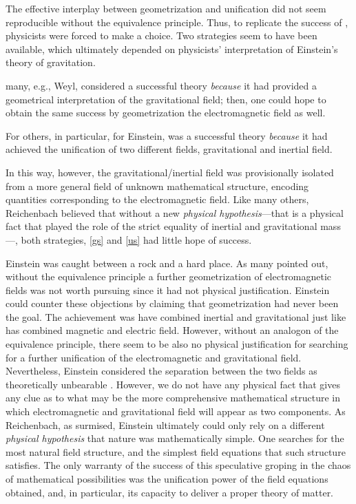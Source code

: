 \documentclass[draft]{article}
\begin{document}
The effective interplay between geometrization and unification did not seem reproducible without the equivalence principle. Thus, to replicate the success of \gr, physicists were forced to make a choice. Two strategies seem to have been available, which ultimately depended on physicists' interpretation of Einstein's theory of gravitation. \begin{inparaenum}[(a)] \item \label{gs} many, e.g., Weyl, considered \gr a successful theory \emph{because} it had provided a geometrical interpretation of the gravitational field; then, one could hope to obtain the same success by geometrization the electromagnetic field as well. \item \label{us} For others, in particular, for Einstein, \gr was a successful theory \emph{because} it had achieved the unification of two different fields, gravitational and inertial field. \end{inparaenum} In this way, however, the gravitational/inertial field was provisionally isolated from a more general field of unknown mathematical structure, encoding quantities corresponding to the electromagnetic field. Like many others, Reichenbach believed that without a new \emph{physical hypothesis}---that is a physical fact that played the role of the strict equality of inertial and gravitational mass---, both strategies, \cref{gs} and \cref{us} had little hope of success.

Einstein was caught between a rock and a hard place. As many pointed out, without the equivalence principle a further geometrization of electromagnetic fields was not worth pursuing since it had not physical justification. Einstein could counter these objections by claiming that geometrization had never been the goal. The achievement \gr was have combined inertial and gravitational just like \sr has combined magnetic and electric field. However, without an analogon of the equivalence principle, there seem to be also no physical justification for searching for a further unification of the electromagnetic and gravitational field. Nevertheless, Einstein considered the separation between the two fields as theoretically unbearable \citep[24]{Einstein1930i}. However, we do not have any physical fact that gives any clue as to what may be the more comprehensive mathematical structure in which electromagnetic and gravitational field will appear as two components. As Reichenbach, as surmised, Einstein ultimately could only rely on a different \emph{physical hypothesis} that nature was mathematically simple. One searches for the most natural field structure, and the simplest field equations that such structure satisfies. The only warranty of the success of this speculative groping in the chaos of mathematical possibilities was the unification power of the field equations obtained, and, in particular, its capacity to deliver a proper theory of matter.
\end{document}
